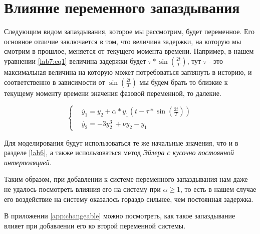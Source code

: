 \chapter{Влияние переменного запаздывания}\label{lab7}

Следующим видом запаздывания, которое мы рассмотрим, будет
переменное. Его основное отличие заключается в том, что
величина задержки, на которую мы смотрим в прошлое,
меняется от текущего момента времени. Например,
в нашем уравнении \ref{lab7:eq1} величина задержки будет
$\tau*\sin(\frac{2t}{T})$, тут $\tau$ - это максимальная
величина на которую может потребоваться заглянуть в историю,
и соответственно в зависимости от $\sin(\frac{2t}{T})$ мы будем
брать то близкие к текущему моменту времени значения фазовой
переменной, то далекие.

\begin{equation}\label{lab7:eq1}
  \begin{cases}
      &\dot{y_1} = y_2 + \alpha * y_1(t-\tau*\sin(\frac{2t}{T}))\\
      &\dot{y_2} = -3y_2^3\ + \nu y_2 - y_1
  \end{cases}
\end{equation}

Для моделирования будут использоваться те же начальные
значения, что и в разделе \ref{lab6}, а также использоваться
метод \textit{Эйлера с кусочно постоянной интерполяцией}.

\clearpage

Таким образом, при добавлении к системе переменного запаздывания
нам даже не удалось посмотреть влияния его на систему при
$\alpha \geq 1$, то есть в нашем случае его воздействие на
систему оказалось гораздо сильнее, чем постоянная задержка.

В приложении \ref{app:changeable} можно посмотреть, как
такое запаздывание влияет при добавлении его ко второй
переменной системы.
